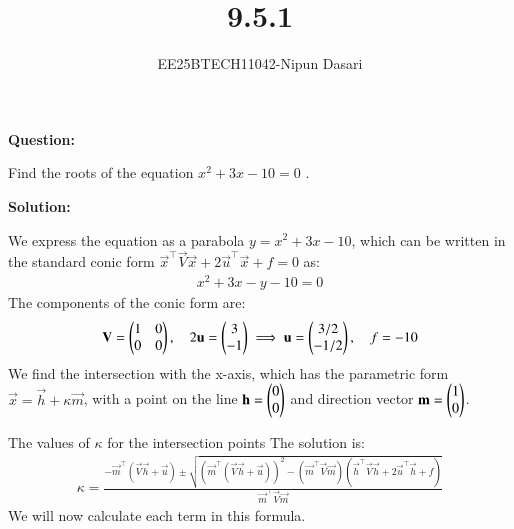 \documentclass[journal]{IEEEtran}
\begin{document}
	
	\title{9.5.1}
	\author{EE25BTECH11042-Nipun Dasari}
	\maketitle
	
	\textbf{Question:}
	
	Find the roots of the equation $x^2 + 3x - 10 = 0$ .
	
	\textbf{Solution:}
	
	We express the equation as a parabola $y = x^2 + 3x - 10$, which can be written in the standard conic form $\vec{x}^\top\vec{V}\vec{x} + 2\vec{u}^\top\vec{x} + f = 0$ as:
	\begin{align}
		x^2 + 3x - y - 10 = 0
	\end{align}
	The components of the conic form are:
	\begin{align}
		\mathbf{V} = \begin{pmatrix}1&0\\0&0\end{pmatrix}, \quad 2\mathbf{u} = \begin{pmatrix}3\\-1\end{pmatrix} \implies \mathbf{u} = \begin{pmatrix}3/2\\-1/2\end{pmatrix}, \quad f = -10
	\end{align}
	We find the intersection with the x-axis, which has the parametric form $\vec{x} = \vec{h} + \kappa\vec{m}$, with a point on the line $\mathbf{h} = \begin{pmatrix}0\\0\end{pmatrix}$ and direction vector $\mathbf{m} = \begin{pmatrix}1\\0\end{pmatrix}$.
	
	The values of $\kappa$ for the intersection points  The solution is:
	\begin{align}
		\kappa = \frac{-\vec{m}^\top(\vec{V}\vec{h} + \vec{u}) \pm \sqrt{(\vec{m}^\top(\vec{V}\vec{h}+\vec{u}))^2 - (\vec{m}^\top\vec{V}\vec{m})(\vec{h}^\top\vec{V}\vec{h} + 2\vec{u}^\top\vec{h} + f)}}{\vec{m}^\top\vec{V}\vec{m}}
	\end{align}
	We will now calculate each term in this formula.
	
\end{document}
